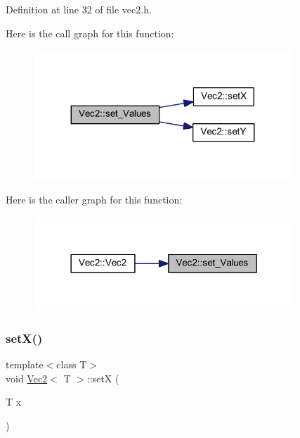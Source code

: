 Definition at line 32 of file vec2.\+h.

Here is the call graph for this function\+:
\nopagebreak
\begin{figure}[H]
\begin{center}
\leavevmode
\includegraphics[width=275pt]{class_vec2_a238a918f6d2695dd187a9778982a1769_cgraph}
\end{center}
\end{figure}
Here is the caller graph for this function\+:
\nopagebreak
\begin{figure}[H]
\begin{center}
\leavevmode
\includegraphics[width=278pt]{class_vec2_a238a918f6d2695dd187a9778982a1769_icgraph}
\end{center}
\end{figure}
\mbox{\label{class_vec2_aec2b21ff78bf3a2e20a044e1ab7d4b53}} 
\subsubsection{\texorpdfstring{setX()}{setX()}}
{\footnotesize\ttfamily template$<$class T$>$ \\
void \mbox{\hyperlink{class_vec2}{Vec2}}$<$ T $>$\+::setX (\begin{DoxyParamCaption}\item[{T}]{x }\end{DoxyParamCaption})\hspace{0.3cm}{\ttfamily [inline]}}



